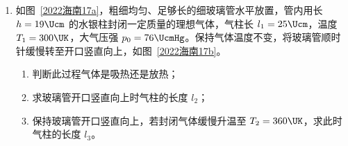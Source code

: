 \documentclass[\gkver]{gaokaozhenti}
\begin{document}
\begin{enumerate}
{	（3）分析改装后的电表，由改装电表原理知，当流过表头的电流为 $\frac{4}{5}I_{g}$ 时，则流过电阻 $R_{1}$ 的电流为 $I_{R_{1}} = 0.76 \UmA - \frac{4}{5}I_{g}$，由并联电路电压相等得 $I_{R_{1}} \cdot R_{1} = \frac{4}{5}I_{g} \cdot r_{g}$，解得 $R_{1} = \frac{1}{18}r_{g}$，则改装电流表的实际量程为 $I_{1} = I_{g} + \frac{I_{g}r_{g}}{R_{1}} = 0.95 \UmA$。

	（4）若把并联 $R_{1}$ 的电流表 G 再改装成量程为 $1 \UmA$ 的电流表，需要再并联电阻 $R_{2}$，$R_{1}$ 与 $R_{2}$ 并联的总电阻为 $R_{12}$，由并联电路特点得 $\frac{r_{g}}{R_{12}} = \frac{1000 \UmuA - 50 \UmuA}{50 \UmuA} = \frac{19}{1}$，即 $R_{12} = \frac{1}{19}r_{g}$，又 $R_{12} = \frac{R_{1}R_{2}}{R_{1} + R_{2}}$，解得 $R_{2} = r_{g}$，由（3）知 $R_{1} = \frac{1}{18}r_{g}$，故 $R_{2} = 18R_{1}$。
}

\item
如图~\ref{2022海南17a}，粗细均匀、足够长的细玻璃管水平放置，管内用长 $h = 19 \Ucm$ 的水银柱封闭一定质量的理想气体，气柱长 $l_{1} = 25 \Ucm$，温度 $T_{1} = 300 \UK$，大气压强 $p_{0} = 76 \UcmHg$。保持气体温度不变，将玻璃管顺时针缓慢转至开口竖直向上，如图~\ref{2022海南17b}。

\begin{enumerate}
	\item
	判断此过程气体是吸热还是放热；
	\item
	求玻璃管开口竖直向上时气柱的长度 $l_{2}$；
	\item
	保持玻璃管开口竖直向上，若封闭气体缓慢升温至 $T_{2} = 360 \UK$，求此时气柱的长度 $l_{3}$。
\end{enumerate}


\end{enumerate}
\end{document}
